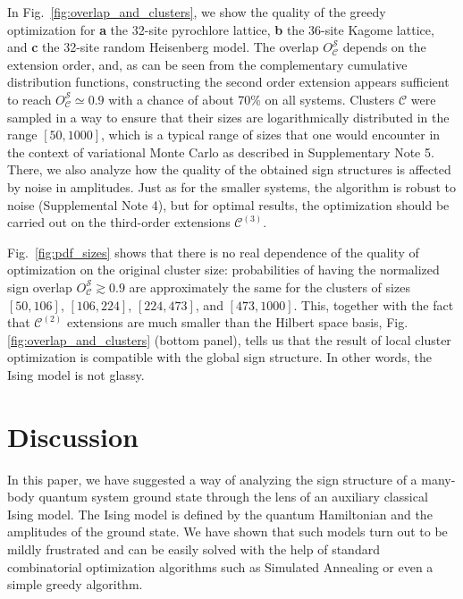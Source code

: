 In Fig.~\ref{fig:overlap_and_clusters}, we show the quality of the greedy optimization for \textbf{a} the 32-site pyrochlore lattice, \textbf{b} the 36-site Kagome lattice, and \textbf{c} the 32-site random Heisenberg model. The overlap $O^\mathcal{S}_\mathcal{C}$ depends on the extension order, and, as can be seen from the complementary cumulative distribution functions, constructing the second order extension appears sufficient to reach $O^\mathcal{S}_\mathcal{C} \simeq 0.9$ with a chance of about 70\% on all systems. Clusters $\mathcal{C}$ were sampled in a way to ensure that their sizes are logarithmically distributed in the range $[50,1000]$, which is a typical range of sizes that one would encounter in the context of variational Monte Carlo as described in Supplementary Note 5. There, we also analyze how the quality of the obtained sign structures is affected by noise in amplitudes. Just as for the smaller systems, the algorithm is robust to noise (Supplemental Note 4), but for optimal results, the optimization should be carried out on the third-order extensions ${\mathcal C}^{(3)}$.

Fig.~\ref{fig:pdf_sizes} shows that there is no real dependence of the quality of optimization on the original cluster size: probabilities of having the normalized sign overlap $O^\mathcal{S}_\mathcal{C} \gtrsim 0.9$ are approximately the same for the clusters of sizes $[50, 106]$, $[106, 224]$, $[224, 473]$, and $[473, 1000]$. This, together with the fact that $\mathcal{C}^{(2)}$ extensions are much smaller than the Hilbert space basis, Fig. \ref{fig:overlap_and_clusters} (bottom panel), tells us that the result of local cluster optimization is compatible with the global sign structure. In other words, the Ising model is not glassy. 


\section{Discussion}

In this paper, we have suggested a way of analyzing the sign structure of a many-body quantum system ground state through the lens of an auxiliary classical Ising model. The Ising model is defined by the quantum Hamiltonian and the amplitudes of the ground state. We have shown that such models turn out to be mildly frustrated and can be easily solved with the help of standard combinatorial optimization algorithms such as Simulated Annealing or even a simple greedy algorithm.


